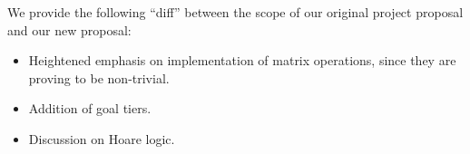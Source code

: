 \documentclass[11pt,conference]{IEEEtran}
\begin{document}
We provide the following ``diff'' between the scope of our original project
proposal and our new proposal:
\begin{itemize}
    \item Heightened emphasis on implementation of matrix operations, since they
        are proving to be non-trivial.
    \item Addition of goal tiers.
    \item Discussion on Hoare logic.
\end{itemize}

{\printbibliography}
\end{document}
